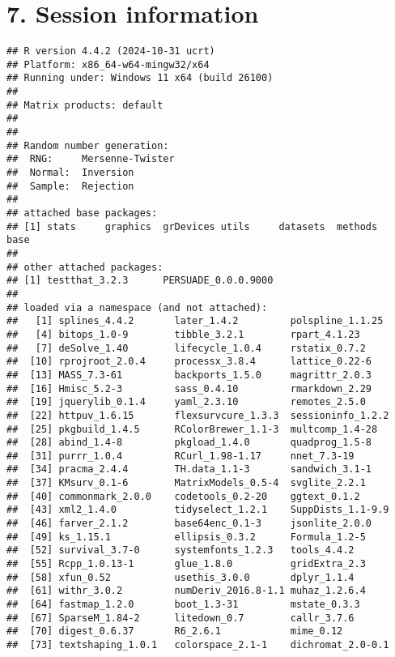 \documentclass[
]{article}
\begin{document}
\clearpage

\section{7. Session information}\label{session-information}

\begin{verbatim}
## R version 4.4.2 (2024-10-31 ucrt)
## Platform: x86_64-w64-mingw32/x64
## Running under: Windows 11 x64 (build 26100)
## 
## Matrix products: default
## 
## 
## Random number generation:
##  RNG:     Mersenne-Twister 
##  Normal:  Inversion 
##  Sample:  Rejection 
##  
## attached base packages:
## [1] stats     graphics  grDevices utils     datasets  methods   base     
## 
## other attached packages:
## [1] testthat_3.2.3      PERSUADE_0.0.0.9000
## 
## loaded via a namespace (and not attached):
##   [1] splines_4.4.2       later_1.4.2         polspline_1.1.25   
##   [4] bitops_1.0-9        tibble_3.2.1        rpart_4.1.23       
##   [7] deSolve_1.40        lifecycle_1.0.4     rstatix_0.7.2      
##  [10] rprojroot_2.0.4     processx_3.8.4      lattice_0.22-6     
##  [13] MASS_7.3-61         backports_1.5.0     magrittr_2.0.3     
##  [16] Hmisc_5.2-3         sass_0.4.10         rmarkdown_2.29     
##  [19] jquerylib_0.1.4     yaml_2.3.10         remotes_2.5.0      
##  [22] httpuv_1.6.15       flexsurvcure_1.3.3  sessioninfo_1.2.2  
##  [25] pkgbuild_1.4.5      RColorBrewer_1.1-3  multcomp_1.4-28    
##  [28] abind_1.4-8         pkgload_1.4.0       quadprog_1.5-8     
##  [31] purrr_1.0.4         RCurl_1.98-1.17     nnet_7.3-19        
##  [34] pracma_2.4.4        TH.data_1.1-3       sandwich_3.1-1     
##  [37] KMsurv_0.1-6        MatrixModels_0.5-4  svglite_2.2.1      
##  [40] commonmark_2.0.0    codetools_0.2-20    ggtext_0.1.2       
##  [43] xml2_1.4.0          tidyselect_1.2.1    SuppDists_1.1-9.9  
##  [46] farver_2.1.2        base64enc_0.1-3     jsonlite_2.0.0     
##  [49] ks_1.15.1           ellipsis_0.3.2      Formula_1.2-5      
##  [52] survival_3.7-0      systemfonts_1.2.3   tools_4.4.2        
##  [55] Rcpp_1.0.13-1       glue_1.8.0          gridExtra_2.3      
##  [58] xfun_0.52           usethis_3.0.0       dplyr_1.1.4        
##  [61] withr_3.0.2         numDeriv_2016.8-1.1 muhaz_1.2.6.4      
##  [64] fastmap_1.2.0       boot_1.3-31         mstate_0.3.3       
##  [67] SparseM_1.84-2      litedown_0.7        callr_3.7.6        
##  [70] digest_0.6.37       R6_2.6.1            mime_0.12          
##  [73] textshaping_1.0.1   colorspace_2.1-1    dichromat_2.0-0.1  

\end{verbatim}
\end{document}
